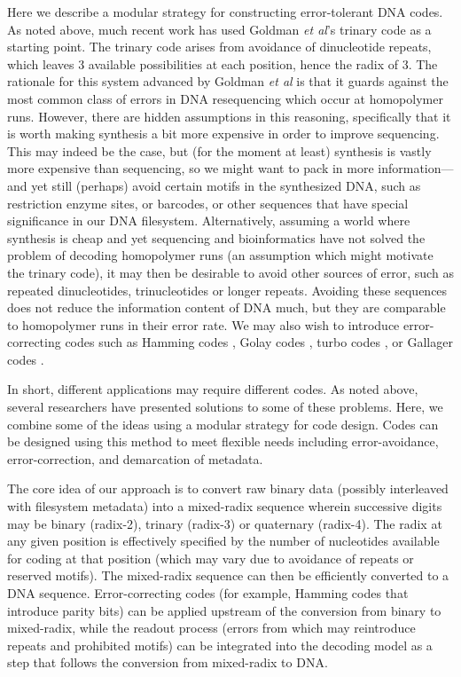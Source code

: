 \documentclass[english]{article}
\begin{document}
Here we describe a modular strategy for constructing error-tolerant DNA codes.
As noted above, much recent work has used Goldman {\em et al}'s trinary code as a starting point.
The trinary code arises from avoidance of dinucleotide repeats, which leaves 3 available possibilities at each position, hence the radix of 3.
The rationale for this system advanced by Goldman {\em et al} is that it guards against the most common class of errors in DNA resequencing which occur at homopolymer runs.
However, there are hidden assumptions in this reasoning, specifically that it is worth making synthesis a bit more expensive in order to improve sequencing.
This may indeed be the case, but (for the moment at least) synthesis is vastly more expensive than sequencing,
so we might want to pack in more information---and yet still (perhaps) avoid certain motifs in the synthesized DNA,
such as restriction enzyme sites, or barcodes, or other sequences that have special significance in our DNA filesystem.
Alternatively, assuming a world where synthesis is cheap and yet sequencing and bioinformatics have not solved the problem of decoding homopolymer runs
(an assumption which might motivate the trinary code),
it may then be desirable to avoid other sources of error, such as repeated dinucleotides, trinucleotides or longer repeats.
Avoiding these sequences does not reduce the information content of DNA much, but they are comparable to homopolymer runs in their error rate.
We may also wish to introduce error-correcting codes such as Hamming codes \cite{Mackay2003}, Golay codes \cite{GuptaEtAl2015},
turbo codes \cite{FreyMackay98,MurphyEtAl1999}, or Gallager codes \cite{Mackay1997}.

In short, different applications may require different codes.
As noted above, several researchers have presented solutions to some of these problems.
Here, we combine some of the ideas using a modular strategy for code design.
Codes can be designed using this method to meet flexible needs
including error-avoidance, error-correction, and demarcation of metadata.

The core idea of our approach is to convert raw binary data (possibly interleaved with filesystem metadata) into a mixed-radix sequence
wherein successive digits may be binary (radix-2), trinary (radix-3) or quaternary (radix-4).
The radix at any given position is effectively specified by the number of nucleotides available for coding at that position
(which may vary due to avoidance of repeats or reserved motifs).
The mixed-radix sequence can then be efficiently converted to a DNA sequence.
Error-correcting codes (for example, Hamming codes that introduce parity bits)
can be applied upstream of the conversion from binary to mixed-radix,
while the readout process (errors from which may reintroduce repeats and prohibited motifs)
can be integrated into the decoding model as a step that follows the conversion from mixed-radix to DNA.
\end{document}
